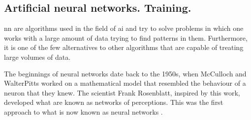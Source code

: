 \subsection{Artificial neural networks. Training.}


\acrlong{nn} are algorithms used in the field of \acrshort{ai} and try to solve problems in which one works with a large amount of data trying to find patterns in them. Furthermore, it is one of the few alternatives to other algorithms that are capable of treating large volumes of data.
\newline

The beginnings of neural networks date back to the 1950s, when McCulloch and WalterPitts \cite{kleene} worked on a mathematical model that resembled the behaviour of a neuron that they knew. The scientist Frank Rosenblatt, inspired by this work, developed what are known as networks of perceptions. This was the first approach to what is now known as neural networks \cite{nielsen}.









